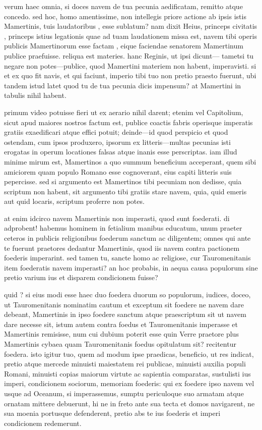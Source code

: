  verum haec omnia, si doces navem de tua pecunia aedificatam, remitto atque concedo. sed hoc, homo amentissime, non intellegis priore actione ab ipsis istis Mamertinis, tuis laudatoribus , esse sublatum? nam dixit Heius, princeps civitatis , princeps istius legationis quae ad tuam laudationem missa est, navem tibi operis publicis Mamertinorum esse factam , eique faciendae senatorem Mamertinum publice praefuisse. reliqua est materies. hanc Reginis, ut ipsi dicunt— tametsi tu negare non potes—publice, quod Mamertini materiem non habent, imperavisti. si et ex quo fit navis, et qui faciunt, imperio tibi tuo non pretio praesto fuerunt, ubi tandem istud latet quod tu de tua pecunia dicis impensum? at Mamertini in tabulis nihil habent.

 primum video potuisse fieri ut ex aerario nihil darent; etenim vel Capitolium, sicut apud maiores nostros factum est, publice coactis fabris operisque imperatis gratiis exaedificari atque effici potuit; deinde—id quod perspicio et quod ostendam, cum ipsos produxero, ipsorum ex litteris—multas pecunias isti erogatas in operum locationes falsas atque inanis esse perscriptas. iam illud minime mirum est, Mamertinos a quo summum beneficium acceperant, quem sibi amiciorem quam populo Romano esse cognoverant, eius capiti litteris suis pepercisse. sed si argumento est Mamertinos tibi pecuniam non dedisse, quia scriptum non habent, sit argumento tibi gratiis stare navem, quia, quid emeris aut quid locaris, scriptum proferre non potes.

 at enim idcirco navem Mamertinis non imperasti, quod sunt foederati. di adprobent! habemus hominem in fetialium manibus educatum, unum praeter ceteros in publicis religionibus foederum sanctum ac diligentem; omnes qui ante te fuerunt praetores dedantur Mamertinis, quod iis navem contra pactionem foederis imperarint. sed tamen tu, sancte homo ac religiose, cur Tauromenitanis item foederatis navem imperasti? an hoc probabis, in aequa causa populorum sine pretio varium ius et disparem condicionem fuisse?

 quid ? si eius modi esse haec duo foedera duorum so populorum, iudices, doceo, ut Tauromenitanis nominatim cautum et exceptum sit foedere ne navem dare debeant, Mamertinis in ipso foedere sanctum atque praescriptum sit ut navem dare necesse sit, istum autem contra foedus et Tauromenitanis imperasse et Mamertinis remisisse, num cui dubium poterit esse quin Verre praetore plus Mamertinis cybaea quam Tauromenitanis foedus opitulatum sit? recitentur foedera. isto igitur tuo, quem ad modum ipse praedicas, beneficio, ut res indicat, pretio atque mercede minuisti maiestatem rei publicae, minuisti auxilia populi Romani, minuisti copias maiorum virtute ac sapientia comparatas, sustulisti ius imperi, condicionem sociorum, memoriam foederis: qui ex foedere ipso navem vel usque ad Oceanum, si imperassemus, sumptu periculoque suo armatam atque ornatam mittere debuerunt, hi ne in freto ante sua tecta et domos navigarent, ne sua moenia portusque defenderent, pretio abs te ius foederis et imperi condicionem redemerunt.

